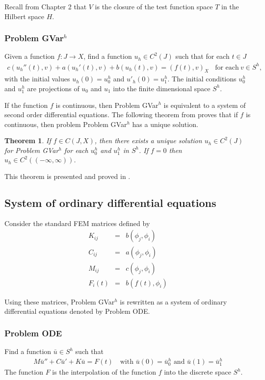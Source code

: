 \documentclass[../../main.tex]{subfiles}
\begin{document}
Recall from Chapter 2 that $V$ is the closure of the test function space $T$ in
the Hilbert space $H$.

\subsubsection*{Problem GVar$^h$}
Given a function $f: J \rightarrow X$, find a function $u_h \in C^2(J)$ such that for each $t\in J$
\begin{eqnarray}
	c(u_h''(t),v)+a(u_h'(t),v)+b(u_h(t),v)= (f(t),v)_{X} \ \ \ \ \textrm{for each} \ v \in S^h, \label{DC_E2}
\end{eqnarray}
with the initial values $u_h(0)=u^h_{0}$ and $u'_h(0)=u^h_{1}$. The initial conditions $u^h_{0}$ and $u^h_{1}$ are projections of $u_0$ and $u_1$ into the finite dimensional space $S^h$.

If the function $f$ is continuous, then Problem GVar$^h$ is equivalent to a
system of second order differential equations. The following theorem from
\cite{BV13} proves that if $f$ is continuous, then problem Problem GVar$^h$ has
a unique solution.

\newtheorem{DC_Thm2}{Theorem}
\begin{DC_Thm2} \label{DC_THM2}
	If $f \in C(J,X)$, then there exists a unique solution $u_h \in C^2(J)$ for Problem GVar$^h$ for each $u_0^h$ and $u_1^h$ in $S^h$. If $f = 0$ then $u_h \in C^2((-\infty, \infty))$.
\end{DC_Thm2}

This theorem is presented and proved in \cite{BV13}.

\subsection{System of ordinary differential equations}
Consider the standard FEM matrices defined by
\begin{eqnarray*}
	K_{ij} & = & b(\phi_j, \phi_i)\\
	C_{ij} & = & a(\phi_j, \phi_i)\\
	M_{ij} & = & c(\phi_j, \phi_i)\\
	F_{i}(t) & = & b(f(t), \phi_i)
\end{eqnarray*}

Using these matrices, Problem GVar$^h$ is rewritten as a system of ordinary
differential equations denoted by Problem ODE. \subsubsection*{Problem ODE}
Find a function $\bar{u} \in S^h$ such that
\begin{eqnarray}
	M\bar{u}'' + C \bar{u}' + K\bar{u} = F(t) \ \ \ \textrm{ with } \bar{u}(0) = \bar{u}^h_0 \textrm{ and }  \bar{u}(1) = \bar{u}^h_1 \label{ODE}
\end{eqnarray}
The function $F$ is the interpolation of the function $f$ into the discrete space $S^h$.
\end{document}
